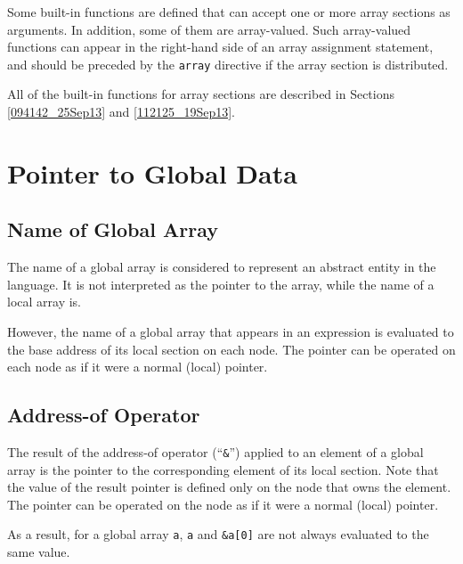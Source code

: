 Some built-in functions are defined that can accept one or more array
sections as arguments. In addition, some of them are array-valued.
%
Such array-valued functions can appear in the right-hand side of an
array assignment statement, and should be preceded by the {\tt array}
directive if the array section is distributed.

All of the built-in functions for array sections are described in
Sections \ref{094142_25Sep13} and \ref{112125_19Sep13}.


\section{Pointer to Global Data}
\label{sec:pointer to global data}

\subsection{Name of Global Array}

The name of a global array is considered to represent an abstract entity
in the {\XMP} language. It is not interpreted as the pointer to the array,
while the name of a local array is.

However, the name of a global array that appears in an expression is
evaluated to the base address of its local section on each node. The
pointer can be operated on each node as if it were a normal (local)
pointer.

\subsection{Address-of Operator}

The result of the address-of operator (``{\tt \&}'') applied to an
element of a global array is the pointer to the corresponding element of
its local section. Note that the value of the result pointer is defined
only on the node that owns the element. The pointer can be operated on
the node as if it were a normal (local) pointer.

As a result, for a global array {\tt a}, {\tt a} and {\tt \&a[0]} are
not always evaluated to the same value.


